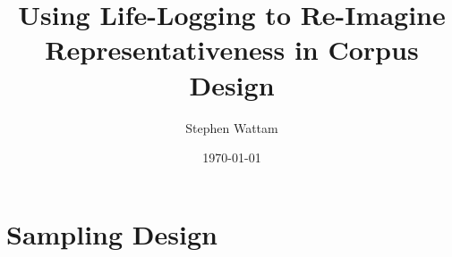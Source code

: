 \documentclass[xcolor=x11names,compress]{beamer}
\title{Using Life-Logging to Re-Imagine Representativeness in Corpus Design}
\author{Stephen Wattam}
\institute[2013]{Lancaster University}
\date{\tiny \today}
\begin{document}
\maketitle





% 
% 
% 
% 
%                     
% 
% 
% 

\section{Sampling Design}
\end{document}

